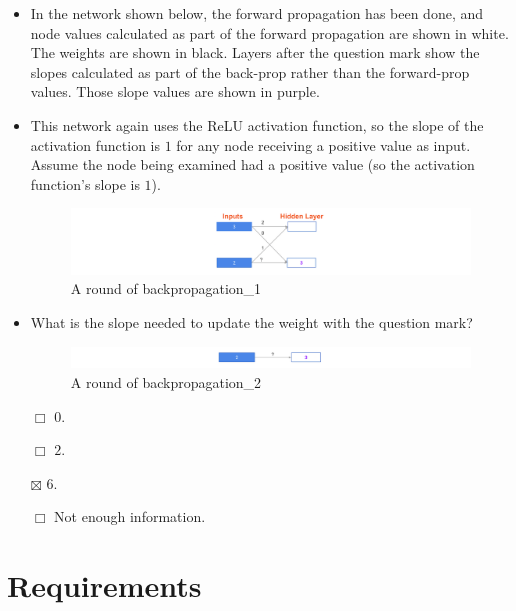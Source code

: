 \documentclass[11pt, twoside]{article}
\begin{document}
\begin{itemize}
\item
  In the network shown below, the forward propagation has been done, and
  node values calculated as part of the forward propagation are shown in
  white. The weights are shown in black. Layers after the question mark
  show the slopes calculated as part of the back-prop rather than the
  forward-prop values. Those slope values are shown in purple.
\item
  This network again uses the ReLU activation function, so the slope of
  the activation function is \(1\) for any node receiving a positive
  value as input. Assume the node being examined had a positive value
  (so the activation function's slope is \(1\)).

  \begin{figure}
  \centering
  \includegraphics{../Figures/13. A round of backpropagation_1.png}
  \caption{A round of backpropagation\_1}
  \end{figure}
\item
  What is the slope needed to update the weight with the question mark?

  \begin{figure}
  \centering
  \includegraphics{../Figures/14. A round of backpropagation_2.png}
  \caption{A round of backpropagation\_2}
  \end{figure}

  \(\Box\) \(0\).

  \(\Box\) \(2\).

  \(\boxtimes\) \(6\).

  \(\Box\) Not enough information.
\end{itemize}

    \hypertarget{requirements}{%
\section{Requirements}\label{requirements}}
\end{document}
